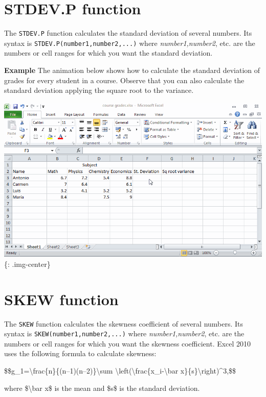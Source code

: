 \section{STDEV.P function}
\label{stdev.pfunction}

The \texttt{STDEV.P} function calculates the standard deviation of several numbers. Its syntax is \texttt{STDEV.P(number1,number2,...)} where \emph{number1,number2}, etc. are the numbers or cell ranges for which you want the standard deviation. 

\textbf{Example} The animation below shows how to calculate the standard deviation of grades for every student in a course. Observe that you can also calculate the standard deviation applying the square root to the variance. 

\includegraphics[keepaspectratio,width=\textwidth,height=0.75\textheight]{img/example_function_stdevp.gif}
\{: .img-center\}

\section{SKEW function}
\label{skewfunction}

The \texttt{SKEW} function calculates the skewness coefficient of several numbers. Its syntax is \texttt{SKEW(number1,number2,...)} where \emph{number1,number2}, etc. are the numbers or cell ranges for which you want the skewness coefficient. Excel 2010 uses the following formula to calculate skewness:

\$\$g\_1=\textbackslash{}frac\{n\}\{(n--1)(n--2)\}\textbackslash{}sum \textbackslash{}left(\textbackslash{}frac\{x\_i-\textbackslash{}bar x\}\{s\}\textbackslash{}right)\^{}3,\$\$ 

where \$\textbackslash{}bar x\$ is the mean and \$s\$ is the standard deviation. 

